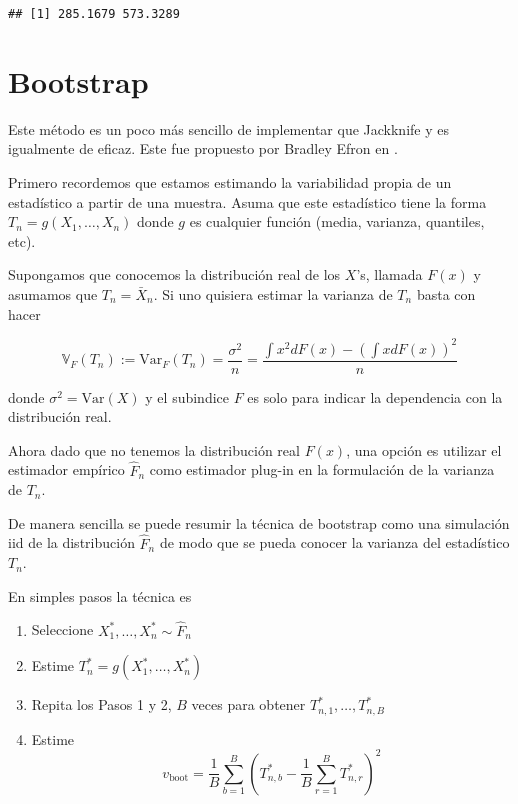 \documentclass[
  12pt,
]{book}
\providecommand{\tightlist}{%
  \setlength{\itemsep}{0pt}\setlength{\parskip}{0pt}}
\theoremstyle{definition}
\theoremstyle{definition}
\theoremstyle{definition}
\theoremstyle{definition}
\theoremstyle{remark}
\begin{document}
\begin{verbatim}
## [1] 285.1679 573.3289
\end{verbatim}

\hypertarget{bootstrap}{%
\section{Bootstrap}\label{bootstrap}}

Este método es un poco más sencillo de implementar que Jackknife y es
igualmente de eficaz. Este fue propuesto por Bradley Efron en \autocite{Efron1979}.

Primero recordemos que estamos estimando la variabilidad propia de un estadístico a partir de
una muestra. Asuma que este estadístico tiene la forma \(T_{n}=g\left( X_{1},\ldots,X_{n} \right)\)
donde \(g\) es cualquier función (media, varianza, quantiles, etc).

Supongamos que conocemos la distribución real de los \(X\)'s, llamada \(F(x)\) y asumamos que \(T_n=\bar X_n\). Si uno
quisiera estimar la varianza de \(T_n\) basta con hacer

\begin{equation*}
\mathbb{V}_{F}\left(T_{n}\right):=\mathrm{Var}_{F}\left(T_{n}\right)
= \frac{\sigma^{2}}{n}=\frac{\int x^{2}  dF(x)-\left(\int x
dF(x)\right)^{2}}{n}
\end{equation*}

donde \(\sigma^{2} = \mathrm{Var}\left(X\right)\) y el subindice \(F\) es solo para indicar la dependencia con la distribución real.

Ahora dado que no tenemos la distribución real \(F(x)\), una opción es utilizar el estimador empírico \(\hat{F}_n\) como estimador plug-in en la formulación de la varianza de \(T_n\).

De manera sencilla se puede resumir la técnica de bootstrap como una simulación iid de la distribución \(\hat{F}_n\) de modo que se pueda conocer la varianza del estadístico \(T_n\).

En simples pasos la técnica es

\begin{enumerate}
\def\labelenumi{\arabic{enumi}.}
\tightlist
\item
  Seleccione \(X_{1}^{*}, \ldots, X_{n}^{*} \sim \widehat{F}_{n}\)
\item
  Estime \(T_{n}^{*}=g\left(X_{1}^{*}, \ldots, X_{n}^{*}\right)\)
\item
  Repita los Pasos 1 y 2, \(B\) veces para obtener \(T_{n, 1}^{*}, \ldots, T_{n, B}^{*}\)
\item
  Estime
  \[
  v_{\mathrm{boot}}=\frac{1}{B} \sum_{b=1}^{B}\left(T_{n, b}^{*}-\frac{1}{B} \sum_{r=1}^{B} T_{n, r}^{*}\right)^{2}
  \]
\end{enumerate}
\end{document}
